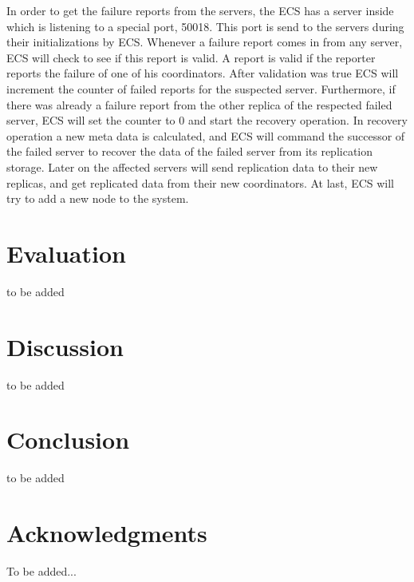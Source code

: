 \documentclass{sig-alternate}
\begin{document}
In order to get the failure reports from the servers, the ECS has a server inside which is listening to a special port, 50018. This port is send to the servers during their initializations by ECS. Whenever a failure report comes in from any server, ECS will check to see if this report is valid. A report is valid if the reporter reports the failure of one of his coordinators. After validation was true ECS will increment the counter of failed reports for the suspected server. Furthermore, if there was already a failure report from the other replica of the respected failed server, ECS will set the counter to 0 and start the recovery operation. In recovery operation a new meta data is calculated, and ECS will command the successor of the failed server to recover the data of the failed server from its replication storage. Later on the affected servers will send replication data to their new replicas, and get replicated data from their new coordinators. At last, ECS will try to add a new node to the system.

\section{Evaluation}
to be added
\section{Discussion}
to be added
\section{Conclusion}
to be added

\section{Acknowledgments}
To be added...
%

%
%

\end{document}
